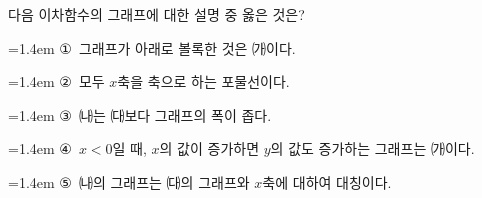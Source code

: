 다음 이차함수의 그래프에 대한 설명 중 옳은 것은?
\par\medskip\par\noindent\hangindent=1.4em {\small ①}\ 그래프가 아래로 볼록한 것은 ㈎이다.\par\noindent\hangindent=1.4em {\small ②}\ 모두 $x$축을 축으로 하는 포물선이다.\par\noindent\hangindent=1.4em {\small ③}\ ㈏는 ㈐보다 그래프의 폭이 좁다.\par\noindent\hangindent=1.4em {\small ④}\ $x<0$일 때, $x$의 값이 증가하면 $y$의 값도 증가하는 그래프는 ㈎이다.\par\noindent\hangindent=1.4em {\small ⑤}\ ㈏의 그래프는 ㈐의 그래프와 $x$축에 대하여 대칭이다.\par\medskip
